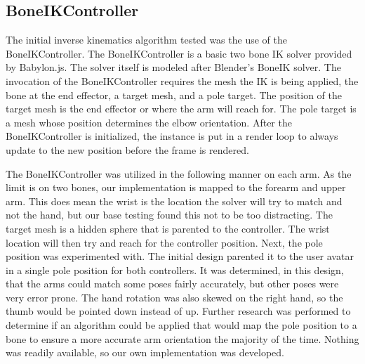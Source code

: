 \documentclass{vgtc}                          %
\begin{document}
\subsection{BoneIKController}

The initial inverse kinematics algorithm tested was the use of the BoneIKController. The BoneIKController is a basic two bone IK solver provided by Babylon.js. The solver itself is modeled after Blender’s BoneIK solver. The invocation of the BoneIKController requires the mesh the IK is being applied, the bone at the end effector, a target mesh, and a pole target. The position of the target mesh is the end effector or where the arm will reach for. The pole target is a mesh whose position determines the elbow orientation. After the BoneIKController is initialized, the instance is put in a render loop to always update to the new position before the frame is rendered.

The BoneIKController was utilized in the following manner on each arm. As the limit is on two bones, our implementation is mapped to the forearm and upper arm. This does mean the wrist is the location the solver will try to match and not the hand, but our base testing found this not to be too distracting. The target mesh is a hidden sphere that is parented to the controller. The wrist location will then try and reach for the controller position. Next, the pole position was experimented with. The initial design parented it to the user avatar in a single pole position for both controllers. It was determined, in this design, that the arms could match some poses fairly accurately, but other poses were very error prone. The hand rotation was also skewed on the right hand, so the thumb would be pointed down instead of up. Further research was performed to determine if an algorithm could be applied that would map the pole position to a bone to ensure a more accurate arm orientation the majority of the time. Nothing was readily available, so our own implementation was developed.
 
\end{document}
